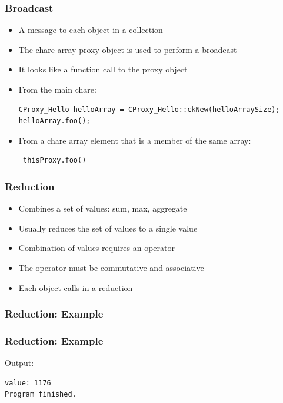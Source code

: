 \begin{frame}[fragile]
  \frametitle{Broadcast}
  \begin{itemize}
    \item A message to each object in a collection
    \item The chare array proxy object is used to perform a broadcast
    \item It looks like a function call to the proxy object
    \item From the main chare:
    \begin{lstlisting}
CProxy_Hello helloArray = CProxy_Hello::ckNew(helloArraySize);
helloArray.foo();
    \end{lstlisting}
    \item From a chare array element that is a member of the same array:
     \begin{lstlisting}
 thisProxy.foo()
    \end{lstlisting}
  \end{itemize}
\end{frame}

\begin{frame}[fragile]
  \frametitle{Reduction}
  \begin{itemize}
  \item Combines a set of values: sum, max, aggregate
  \item Usually reduces the set of values to a single value
  \item Combination of values requires an operator
  \item The operator must be commutative and associative
  \item Each object calls  in a reduction
  \end{itemize}
\end{frame}

\begin{frame}[fragile]
  \frametitle{Reduction: Example}
  
\end{frame}

\begin{frame}[fragile]
  \frametitle{Reduction: Example}
  
Output:
  \begin{lstlisting}[basicstyle=\tiny]
value: 1176
Program finished.
  \end{lstlisting}
\end{frame}
